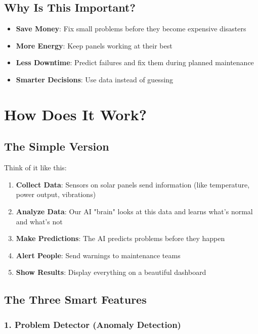 \documentclass[12pt,a4paper]{article}
\begin{document}
\subsection{Why Is This Important?}

\begin{itemize}[leftmargin=*]
    \item \textbf{Save Money}: Fix small problems before they become expensive disasters
    \item \textbf{More Energy}: Keep panels working at their best
    \item \textbf{Less Downtime}: Predict failures and fix them during planned maintenance
    \item \textbf{Smarter Decisions}: Use data instead of guessing
\end{itemize}

\newpage

\section{How Does It Work?}

\subsection{The Simple Version}

Think of it like this:

\begin{enumerate}[leftmargin=*]
    \item \textbf{Collect Data}: Sensors on solar panels send information (like temperature, power output, vibrations)
    \item \textbf{Analyze Data}: Our AI "brain" looks at this data and learns what's normal and what's not
    \item \textbf{Make Predictions}: The AI predicts problems before they happen
    \item \textbf{Alert People}: Send warnings to maintenance teams
    \item \textbf{Show Results}: Display everything on a beautiful dashboard
\end{enumerate}

\subsection{The Three Smart Features}

\subsubsection{1. Problem Detector (Anomaly Detection)}
\end{document}
